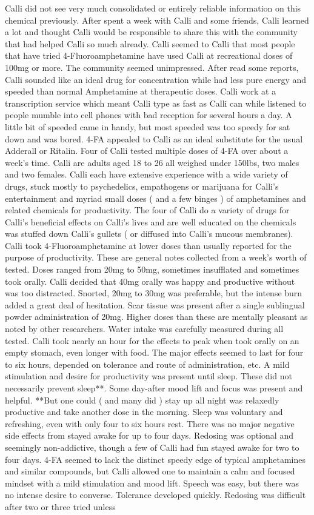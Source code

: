 \documentclass[12pt]{book}
\begin{document}
Calli did not see very much consolidated or entirely reliable information on this chemical previously. After spent a week with Calli and some friends, Calli learned a lot and thought Calli would be responsible to share this with the community that had helped Calli so much already. Calli seemed to Calli that most people that have tried 4-Fluoroamphetamine have used Calli at recreational doses of 100mg or more. The community seemed unimpressed. After read some reports, Calli sounded like an ideal drug for concentration while had less pure energy and speeded than normal Amphetamine at therapeutic doses. Calli work at a transcription service which meant Calli type as fast as Calli can while listened to people mumble into cell phones with bad reception for several hours a day. A little bit of speeded came in handy, but most speeded was too speedy for sat down and was bored. 4-FA appealed to Calli as an ideal substitute for the usual Adderall or Ritalin. Four of Calli tested multiple doses of 4-FA over about a week's time. Calli are adults aged 18 to 26 all weighed under 150lbs, two males and two females. Calli each have extensive experience with a wide variety of drugs, stuck mostly to psychedelics, empathogens or marijuana for Calli's entertainment and myriad small doses ( and a few binges ) of amphetamines and related chemicals for productivity. The four of Calli do a variety of drugs for Calli's beneficial effects on Calli's lives and are well educated on the chemicals was stuffed down Calli's gullets ( or diffused into Calli's mucous membranes). Calli took 4-Fluoroamphetamine at lower doses than usually reported for the purpose of productivity. These are general notes collected from a week's worth of tested. Doses ranged from 20mg to 50mg, sometimes insufflated and sometimes took orally. Calli decided that 40mg orally was happy and productive without was too distracted. Snorted, 20mg to 30mg was preferable, but the intense burn added a great deal of hesitation. Scar tissue was present after a single sublingual powder administration of 20mg. Higher doses than these are mentally pleasant as noted by other researchers. Water intake was carefully measured during all tested. Calli took nearly an hour for the effects to peak when took orally on an empty stomach, even longer with food. The major effects seemed to last for four to six hours, depended on tolerance and route of administration, etc. A mild stimulation and desire for productivity was present until sleep. These did not necessarily prevent sleep**. Some day-after mood lift and focus was present and helpful. **But one could ( and many did ) stay up all night was relaxedly productive and take another dose in the morning. Sleep was voluntary and refreshing, even with only four to six hours rest. There was no major negative side effects from stayed awake for up to four days. Redosing was optional and seemingly non-addictive, though a few of Calli had fun stayed awake for two to four days. 4-FA seemed to lack the distinct speedy edge of typical amphetamines and similar compounds, but Calli allowed one to maintain a calm and focused mindset with a mild stimulation and mood lift. Speech was easy, but there was no intense desire to converse. Tolerance developed quickly. Redosing was difficult after two or three tried unless 
\end{document}

